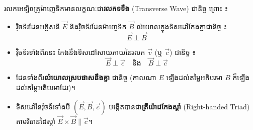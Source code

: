 \vspace{0.4em}
\noindent
{}

\noindent
រលកអេឡិចត្រូម៉ាញេទិកមានលក្ខណៈជា\textbf{រលកទទឹង} ({\englishfont Transverse Wave}) ជានិច្ច ព្រោះ ៖
\begin{itemize}[itemsep=3pt, topsep=2pt, leftmargin=1.6em]
	\item វ៉ិចទ័រដែនអគ្គិសនី $\vec{E}$ និងវ៉ិចទ័រដែនម៉ាញេទិក $\vec{B}$ លំយោលក្នុងទិសដៅកែងគ្នាជានិច្ច ៖
	\[ \vec{E} \perp \vec{B} \]
	\item វ៉ិចទ័រទាំងពីរនេះ កែងនឹងទិសដៅសាយភាយនៃរលក $\vec{v}$ (ឬ $\vec{c}$) ជានិច្ច ៖
	\[ \vec{E} \perp \vec{c} \quad \text{និង} \quad \vec{B} \perp \vec{c} \]
	\item ដែនទាំងពីរ\textbf{លំយោលស្របផាសនឹងគ្នា} ជានិច្ច (កាលណា $E$ ឡើងដល់តម្លៃអតិបរមា $B$ ក៏ឡើងដល់តម្លៃអតិបរមាដែរ)។
	\item ទិសដៅនៃវ៉ិចទ័រទាំងបី $(\vec{E}, \vec{B}, \vec{c})$ បង្កើតបានជា\textbf{ត្រីយ៉ាដកែងស្ដាំ} ({\englishfont Right-handed Triad}) តាមវិធានដៃស្ដាំ $\vec{E} \times \vec{B} \parallel \vec{c}$។
\end{itemize}

